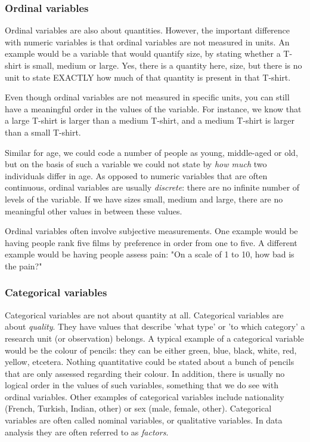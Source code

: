 \documentclass[]{report}\usepackage[]{graphicx}\usepackage[]{color}
\begin{document}
 

\subsubsection{Ordinal variables}

Ordinal variables are also about quantities. However, the important difference with numeric variables is that ordinal variables are not measured in units. An example would be a variable that would quantify size, by stating whether a T-shirt is small, medium or large. Yes, there is a quantity here, size, but there is no unit to state EXACTLY how much of that quantity is present in that T-shirt. 

Even though ordinal variables are not measured in specific units, you can still have a meaningful order in the values of the variable. For instance, we know that a large T-shirt is larger than a medium T-shirt, and a medium T-shirt is larger than a small T-shirt.

Similar for age, we could code a number of people as young, middle-aged or old, but on the basis of such a variable we could not state by \textit{how much} two individuals differ in age. As opposed to numeric variables that are often continuous, ordinal variables are usually \textit{discrete}: there are no infinite number of levels of the variable. If we have sizes small, medium and large, there are no meaningful other values in between these values. 

Ordinal variables often involve subjective measurements. One example would be having people rank five films by preference in order from one to five. A different example would be having people assess pain: "On a scale of 1 to 10, how bad is the pain?" 

\subsubsection{Categorical variables}

Categorical variables are not about quantity at all. Categorical variables are about \textit{quality}. They have values that describe 'what type' or 'to which category' a research unit (or observation) belongs. A typical example of a categorical variable would be the colour of pencils: they can be either green, blue, black, white, red, yellow, etcetera. Nothing quantitative could be stated about a bunch of pencils that are only assessed regarding their colour. In addition, there is usually no logical order in the values of such variables, something that we do see with ordinal variables. Other examples of categorical variables include nationality (French, Turkish, Indian, other) or sex (male, female, other). Categorical variables are often called nominal variables, or qualitative variables. In data analysis they are often referred to as \textit{factors}.
\end{document}
